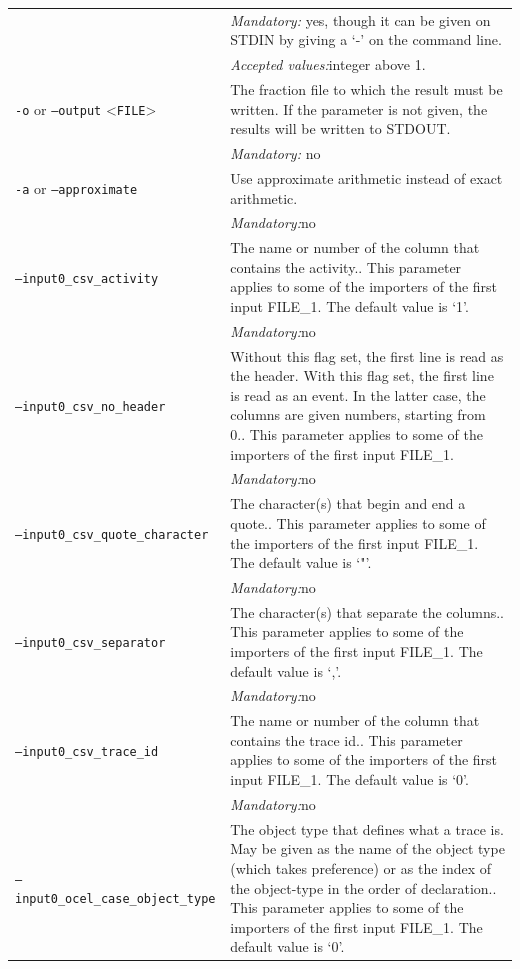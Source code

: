 {\begin{tabularx}{\linewidth}{lX}
&\textit{Mandatory:} \quad yes, though it can be given on STDIN by giving a `-' on the command line.\\
&\textit{Accepted values:}\quad integer above 1.\\
\texttt{-o} or \texttt{--output} <\texttt{FILE}> &
The fraction file to which the result must be written. If the parameter is not given, the results will be written to STDOUT.\\
&\textit{Mandatory:} \quad no\\
\texttt{-a} or \texttt{--approximate} & Use approximate arithmetic instead of exact arithmetic.\\
&\textit{Mandatory:}\quad no\\
\texttt{--input0\_csv\_activity} & The name or number of the column that contains the activity.. This parameter applies to some of the importers of the first input FILE\_1. The default value is `1'.\\
&\textit{Mandatory:}\quad no\\
\texttt{--input0\_csv\_no\_header} & Without this flag set, the first line is read as the header. 
    With this flag set, the first line is read as an event. In the latter case, the columns are given numbers, starting from 0.. This parameter applies to some of the importers of the first input FILE\_1. \\
&\textit{Mandatory:}\quad no\\
\texttt{--input0\_csv\_quote\_character} & The character(s) that begin and end a quote.. This parameter applies to some of the importers of the first input FILE\_1. The default value is `"'.\\
&\textit{Mandatory:}\quad no\\
\texttt{--input0\_csv\_separator} & The character(s) that separate the columns.. This parameter applies to some of the importers of the first input FILE\_1. The default value is `,'.\\
&\textit{Mandatory:}\quad no\\
\texttt{--input0\_csv\_trace\_id} & The name or number of the column that contains the trace id.. This parameter applies to some of the importers of the first input FILE\_1. The default value is `0'.\\
&\textit{Mandatory:}\quad no\\
\texttt{--input0\_ocel\_case\_object\_type} & The object type that defines what a trace is. May be given as the name of the object type (which takes preference) or as the index of the object-type in the order of declaration.. This parameter applies to some of the importers of the first input FILE\_1. The default value is `0'.\\

\end{tabularx}}
